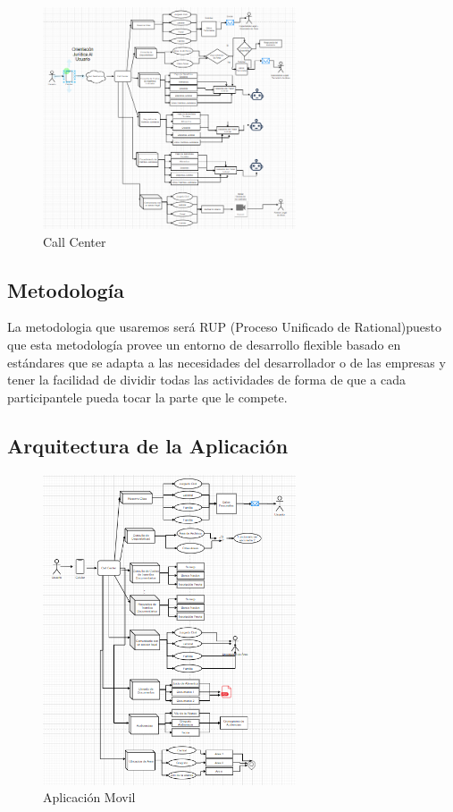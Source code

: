 \documentclass[twoside,twocolumn]{article}
\begin{document}
\begin{figure}[h!]
	\begin{center}
		\includegraphics[width=7.5cm]{./Imagenes/callcenter} 
		\caption{Call Center}
	\end{center}
\end{figure}


\subsection{Metodología}
La metodologia que usaremos será RUP (Proceso Unificado de Rational)puesto que esta metodología provee un entorno de desarrollo flexible basado en estándares que se adapta a las necesidades del desarrollador o de las empresas y tener la facilidad de dividir todas las actividades de forma de que a cada participantele pueda tocar la parte que le compete.
\subsection{Arquitectura de la Aplicación}

\begin{figure}[h!]
	\begin{center}
		\includegraphics[width=7.5cm]{./Imagenes/apk} 
		\caption{Aplicación Movil}
	\end{center}
\end{figure}
\end{document}
